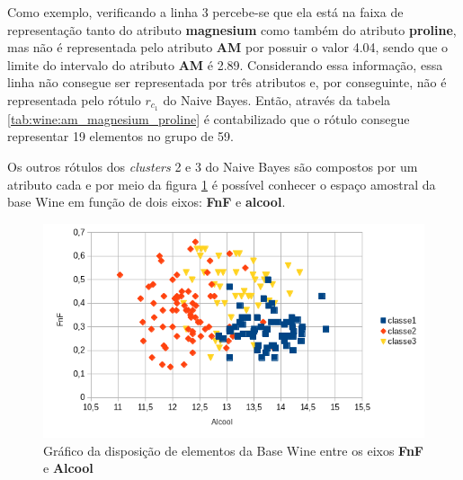 Como exemplo, verificando a linha 3 percebe-se que ela está na faixa de representação tanto do atributo \textbf{magnesium} como também do atributo \textbf{proline}, mas não é representada pelo atributo \textbf{AM} por possuir o valor 4.04, sendo que o limite do intervalo do atributo \textbf{AM} é 2.89. Considerando essa informação, essa linha não consegue ser representada por três atributos e, por conseguinte, não é representada pelo rótulo  ${r_{c_1}}$ do Naive Bayes. Então, através da tabela \ref{tab:wine:am_magnesium_proline} é contabilizado que o rótulo consegue representar 19 elementos no grupo de 59. 

  
Os outros rótulos dos \textit{clusters} 2 e 3 do Naive Bayes são compostos por um atributo cada e por meio da figura \ref{fig:grafico_wine_alcool_FnF} é possível conhecer o espaço amostral da base Wine em função de dois eixos: \textbf{FnF} e \textbf{alcool}. 

\begin{figure}[h!]
        \centering
        \includegraphics[scale=0.9]{figs/grafico_wine_alcool_FnF.png}
        \caption{Gráfico da disposição de elementos da Base Wine entre os eixos \textbf{FnF} e \textbf{Alcool}} \label{fig:grafico_wine_alcool_FnF}
\end{figure}


